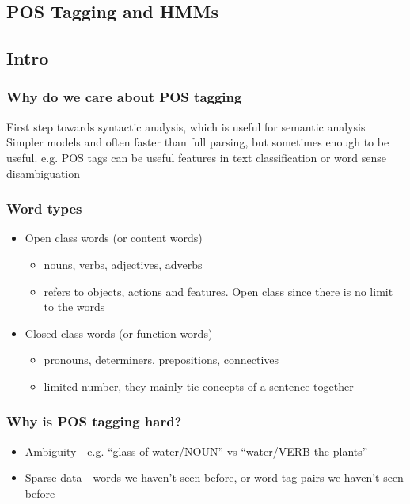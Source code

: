 \documentclass[landscape, 8pt]{extarticle}
\begin{document}
\begin{multicols}{3}
\section{POS Tagging and HMMs}
\subsection{Intro}
\subsubsection{Why do we care about POS tagging}
First step towards syntactic analysis, which is useful for semantic analysis
Simpler models and often faster than full parsing, but sometimes enough to be useful. e.g. POS tags can be useful features in text classification or word sense disambiguation

\subsubsection{Word types}
\begin{itemize}
    \setlength\itemsep{0em}
    \item Open class words (or content words)
        \begin{itemize}
            \setlength\itemsep{0em}
            \item nouns, verbs, adjectives, adverbs
            \item refers to objects, actions and features. Open class since there is no limit to the words
        \end{itemize}
    \item Closed class words (or function words)
        \begin{itemize}
            \setlength\itemsep{0em}
            \item pronouns, determiners, prepositions, connectives
            \item limited number, they mainly tie concepts of a sentence together
        \end{itemize}
\end{itemize}

\subsubsection{Why is POS tagging hard?}
\begin{itemize}
    \setlength\itemsep{0em}
    \item Ambiguity - e.g. ``glass of water/NOUN'' vs ``water/VERB the plants''
    \item Sparse data - words we haven't seen before, or word-tag pairs we haven't seen before
\end{itemize}


\end{multicols}
\end{document}
